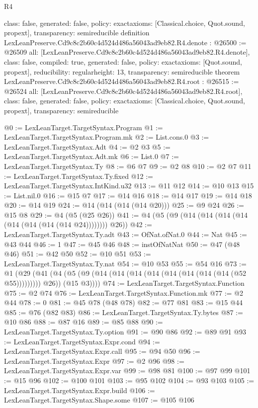 \begin{lexlean}{R4}
\begin{coremodule}
{  class: false,
  generated: false,
  policy: exact{axioms: [Classical.choice, Quot.sound, propext]},
  transparency: semireducible
}
definition LexLeanPreserve.Cd9c8c2b60c4d524d486a56043ad9eb82.R4.denote : @26500 := @26509 {
  all: [LexLeanPreserve.Cd9c8c2b60c4d524d486a56043ad9eb82.R4.denote],
  class: false,
  compiled: true,
  generated: false,
  policy: exact{axioms: [Quot.sound, propext]},
  reducibility: regular{height: 13},
  transparency: semireducible
}
theorem LexLeanPreserve.Cd9c8c2b60c4d524d486a56043ad9eb82.R4.root : @26515 := @26524 {
  all: [LexLeanPreserve.Cd9c8c2b60c4d524d486a56043ad9eb82.R4.root],
  class: false,
  generated: false,
  policy: exact{axioms: [Classical.choice, Quot.sound, propext]},
  transparency: semireducible
}

@0 := LexLeanTarget.TargetSyntax.Program
@1 := LexLeanTarget.TargetSyntax.Program.mk
@2 := List.cons.{0}
@3 := LexLeanTarget.TargetSyntax.Adt
@4 := @2 @3
@5 := LexLeanTarget.TargetSyntax.Adt.mk
@6 := List.{0}
@7 := LexLeanTarget.TargetSyntax.Ty
@8 := @6 @7
@9 := @2 @8
@10 := @2 @7
@11 := LexLeanTarget.TargetSyntax.Ty.fixed
@12 := LexLeanTarget.TargetSyntax.IntKind.u32
@13 := @11 @12
@14 := @10 @13
@15 := List.nil.{0}
@16 := @15 @7
@17 := @14 @16
@18 := @14 @17
@19 := @14 @18
@20 := @14 @19
@24 := @14 (@14 (@14 (@14 @20)))
@25 := @9 @24
@26 := @15 @8
@29 := @4 (@5 (@25 @26))
@41 := @4 (@5 (@9 (@14 (@14 (@14 (@14 (@14 (@14 (@14 (@14 @24)))))))) @26))
@42 := LexLeanTarget.TargetSyntax.Ty.adt
@43 := OfNat.ofNat.{0}
@44 := Nat
@45 := @43 @44
@46 := 1
@47 := @45 @46
@48 := instOfNatNat
@50 := @47 (@48 @46)
@51 := @42 @50
@52 := @10 @51
@53 := LexLeanTarget.TargetSyntax.Ty.nat
@54 := @10 @53
@55 := @54 @16
@73 := @1
    (@29
      (@41 (@4 (@5 (@9 (@14 (@14 (@14 (@14 (@14 (@14 (@14 (@14 (@52 @55))))))))) @26)) (@15 @3))))
@74 := LexLeanTarget.TargetSyntax.Function
@75 := @2 @74
@76 := LexLeanTarget.TargetSyntax.Function.mk
@77 := @2 @44
@78 := 0
@81 := @45 @78 (@48 @78)
@82 := @77 @81
@83 := @15 @44
@85 := @76 (@82 @83)
@86 := LexLeanTarget.TargetSyntax.Ty.bytes
@87 := @10 @86
@88 := @87 @16
@89 := @85 @88
@90 := LexLeanTarget.TargetSyntax.Ty.option
@91 := @90 @86
@92 := @89 @91
@93 := LexLeanTarget.TargetSyntax.Expr.cond
@94 := LexLeanTarget.TargetSyntax.Expr.call
@95 := @94 @50
@96 := LexLeanTarget.TargetSyntax.Expr
@97 := @2 @96
@98 := LexLeanTarget.TargetSyntax.Expr.var
@99 := @98 @81
@100 := @97 @99
@101 := @15 @96
@102 := @100 @101
@103 := @95 @102
@104 := @93 @103
@105 := LexLeanTarget.TargetSyntax.Expr.build
@106 := LexLeanTarget.TargetSyntax.Shape.some
@107 := @105 @106

\end{coremodule}
\end{lexlean}

